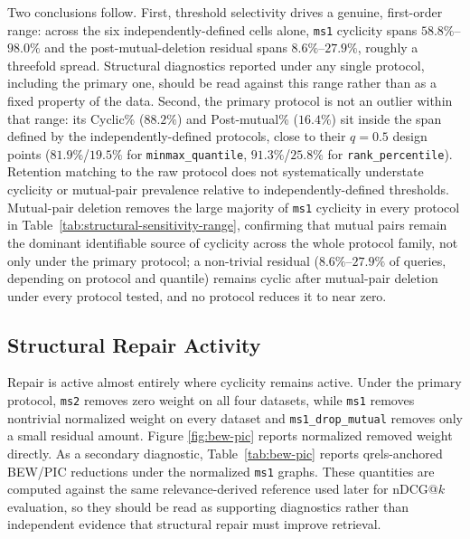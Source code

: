 \documentclass[manuscript,anonymous,review]{acmart}
\begin{document}
Two conclusions follow. First, threshold selectivity drives a genuine,
first-order range: across the six independently-defined cells alone,
\texttt{ms1} cyclicity spans $58.8\%$--$98.0\%$ and the post-mutual-deletion
residual spans $8.6\%$--$27.9\%$, roughly a threefold spread. Structural
diagnostics reported under any single protocol, including the primary one,
should be read against this range rather than as a fixed property of the
data. Second, the primary protocol is not an outlier within that range: its
Cyclic\% ($88.2\%$) and Post-mutual\% ($16.4\%$) sit inside the span defined
by the independently-defined protocols, close to their $q=0.5$ design
points ($81.9\%$/$19.5\%$ for \texttt{minmax\_quantile}, $91.3\%$/$25.8\%$
for \texttt{rank\_percentile}). Retention matching to the raw protocol does
not systematically understate cyclicity or mutual-pair prevalence relative
to independently-defined thresholds. Mutual-pair deletion removes the large
majority of \texttt{ms1} cyclicity in every protocol in
Table~\ref{tab:structural-sensitivity-range}, confirming that mutual pairs
remain the dominant identifiable source of cyclicity across the whole
protocol family, not only under the primary protocol; a non-trivial residual
($8.6\%$--$27.9\%$ of queries, depending on protocol and quantile) remains
cyclic after mutual-pair deletion under every protocol tested, and no
protocol reduces it to near zero.

\subsection{Structural Repair Activity}

Repair is active almost entirely where cyclicity remains active. Under the
primary protocol, \texttt{ms2} removes zero weight on all four datasets, while
\texttt{ms1} removes nontrivial normalized weight on every dataset and
\texttt{ms1\_drop\_mutual} removes only a small residual amount. Figure
\ref{fig:bew-pic} reports normalized removed weight directly. As a secondary
diagnostic, Table~\ref{tab:bew-pic} reports qrels-anchored BEW/PIC reductions
under the normalized \texttt{ms1} graphs. These quantities are computed against
the same relevance-derived reference used later for nDCG@$k$ evaluation, so
they should be read as supporting diagnostics rather than independent evidence
that structural repair must improve retrieval.
\end{document}
